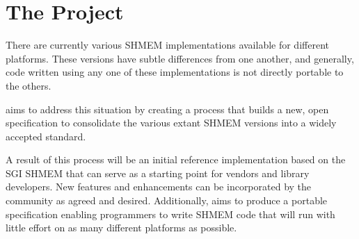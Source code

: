 
\section{The \openshmem Project}

There are currently various SHMEM implementations available for
different platforms. These versions have subtle differences from one
another, and generally, code written using any one of these
implementations is not directly portable to the others.

\openshmem aims to address this situation by creating a process that
builds a new, open specification to consolidate the various extant
SHMEM versions into a widely accepted standard.

A result of this process will be an initial reference implementation
based on the SGI SHMEM that can serve as a starting point for vendors
and library developers. New features and enhancements can be incorporated
by the community as agreed and desired. Additionally, \openshmem aims
to produce a portable specification enabling programmers to write
SHMEM code that will run with little effort on as many different platforms
as possible.
